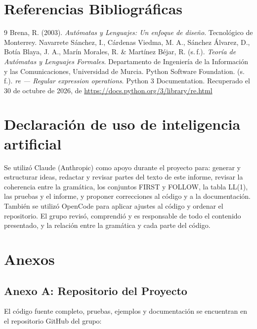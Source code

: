 \documentclass[12pt,a4paper]{article}
\begin{document}
\newpage

\section{Referencias Bibliográficas}

\begin{thebibliography}{9}
     Brena, R. (2003). \textit{Autómatas y Lenguajes: Un enfoque de diseño}. Tecnológico de Monterrey.
     Navarrete Sánchez, I., Cárdenas Viedma, M. A., Sánchez Álvarez, D., Botía Blaya, J. A., Marín Morales, R. \& Martínez Béjar, R. (s.\,f.). \textit{Teoría de Autómatas y Lenguajes Formales}. Departamento de Ingeniería de la Información y las Comunicaciones, Universidad de Murcia.
     Python Software Foundation. (s.\,f.). \textit{re --- Regular expression operations}. Python 3 Documentation. Recuperado el 30 de octubre de 2026, de \url{https://docs.python.org/3/library/re.html}
\end{thebibliography}

\section*{Declaración de uso de inteligencia artificial}

Se utilizó Claude (Anthropic) como apoyo durante el proyecto para: generar y estructurar ideas, redactar y revisar partes del texto de este informe, revisar la coherencia entre la gramática, los conjuntos FIRST y FOLLOW, la tabla LL(1), las pruebas y el informe, y proponer correcciones al código y a la documentación. También se utilizó OpenCode para aplicar ajustes al código y ordenar el repositorio. El grupo revisó, comprendió y es responsable de todo el contenido presentado, y la relación entre la gramática y cada parte del código.

\newpage

\section{Anexos}

\subsection{Anexo A: Repositorio del Proyecto}
El código fuente completo, pruebas, ejemplos y documentación se encuentran en el repositorio GitHub del grupo:
\end{document}
